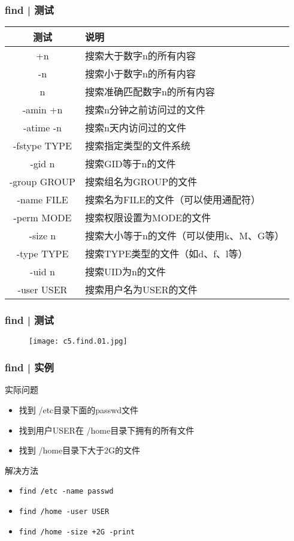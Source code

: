 \begin{frame}
  \frametitle{find | \alert{测试}}
  \begin{table}
    \centering
    \begin{tabularx}{0.9\textwidth}{cX}
      \hline
      \rowcolor{blue!50}测试 & 说明\\
      \hline
      +n & 搜索大于数字n的所有内容\\
      -n & 搜索小于数字n的所有内容\\
      n & 搜索准确匹配数字n的所有内容\\
      -amin +n & 搜索n分钟之前访问过的文件\\
      -atime -n & 搜索n天内访问过的文件\\
      -fstype TYPE & 搜索指定类型的文件系统\\
      -gid n & 搜索GID等于n的文件\\
      -group GROUP & 搜索组名为GROUP的文件\\
      -name FILE & 搜索名为FILE的文件（可以使用通配符）\\
      -perm MODE & 搜索权限设置为MODE的文件\\
      -size n & \small{搜索大小等于n的文件（可以使用k、M、G等）}\\
      -type TYPE & 搜索TYPE类型的文件（如d、f、l等）\\
      -uid n & 搜索UID为n的文件\\
      -user USER & 搜索用户名为USER的文件\\
      \hline
    \end{tabularx}
  \end{table}
\end{frame}

\begin{frame}
  \frametitle{find | 测试}
  \begin{figure}
    \centering
    \texttt{[image: c5.find.01.jpg]}
  \end{figure}
\end{frame}

\begin{frame}[fragile]
  \frametitle{find | \alert{实例}}
  \begin{block}{实际问题}
    \begin{itemize}
      \item<2-> 找到 /etc目录下面的passwd文件
      \item<4-> 找到用户USER在 /home目录下拥有的所有文件
      \item<6-> 找到 /home目录下大于2G的文件
    \end{itemize}
  \end{block}
  \begin{block}{解决方法}
    \begin{itemize}
      \item<3-> \verb|find /etc -name passwd|
      \item<5-> \verb|find /home -user USER|
      \item<7-> \verb|find /home -size +2G -print|
    \end{itemize}
  \end{block}
\end{frame}

